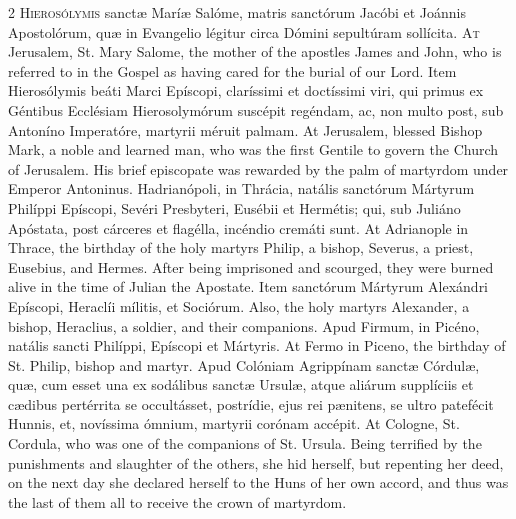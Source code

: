 \begin{paracol}{2}
\lettrine[lines=2]{H}{ierosólymis} sanctæ 
 Maríæ Salóme, matris sanctórum Jacóbi et Joánnis Apostolórum, quæ in 
 Evangelio légitur circa Dómini sepultúram sollícita.
\switchcolumn
{}
\lettrine[lines=2]{A}{t} Jerusalem, St. Mary Salome, the 
 mother of the apostles James and John, who is referred to in the Gospel as 
 having cared for the burial of our Lord.
\switchcolumn*
{}
Item Hierosólymis beáti 
 Marci Epíscopi, claríssimi et doctíssimi viri, qui primus ex Géntibus 
 Ecclésiam Hierosolymórum suscépit regéndam, ac, non multo post, sub Antoníno 
 Imperatóre, martyrii méruit palmam.
\switchcolumn
{}
At Jerusalem, blessed Bishop Mark, a 
 noble and learned man, who was the first Gentile to govern the Church of 
 Jerusalem. His brief episcopate was rewarded by the palm of martyrdom 
 under Emperor Antoninus.
\switchcolumn*
{}
Hadrianópoli, in 
 Thrácia, natális sanctórum Mártyrum Philíppi Epíscopi, Sevéri Presbyteri, 
 Eusébii et Hermétis; qui, sub Juliáno Apóstata, post cárceres et flagélla, 
 incéndio cremáti sunt.
\switchcolumn
{}
At Adrianople in Thrace, the 
 birthday of the holy martyrs Philip, a bishop, Severus, a priest, Eusebius, 
 and Hermes. After being imprisoned and scourged, they were burned 
 alive in the time of Julian the Apostate.
\switchcolumn*
{}
Item sanctórum Mártyrum 
 Alexándri Epíscopi, Heraclíi mílitis, et Sociórum.
\switchcolumn
{}
Also, the holy martyrs Alexander, a 
 bishop, Heraclius, a soldier, and their companions.
\switchcolumn*
{}
Apud Firmum, in Picéno, natális sancti Philíppi, Epíscopi et Mártyris.
\switchcolumn
{}
At Fermo in Piceno, the birthday of 
 St. Philip, bishop and martyr.
\switchcolumn*
{}
Apud Colóniam 
 Agrippínam sanctæ Córdulæ, quæ, cum esset una ex sodálibus sanctæ Ursulæ, 
 atque aliárum supplíciis et cædibus pertérrita se occultásset, postrídie, 
 ejus rei pænitens, se ultro patefécit Hunnis, et, novíssima ómnium, martyrii 
 corónam accépit.
\switchcolumn
{}
At Cologne, St. Cordula, who was one 
 of the companions of St. Ursula. Being terrified by the punishments 
 and slaughter of the others, she hid herself, but repenting her deed, on the 
 next day she declared herself to the Huns of her own accord, and thus was 
 the last of them all to receive the crown of martyrdom.
\switchcolumn*
{}

\end{paracol}
